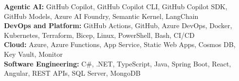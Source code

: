 \textbf{Agentic AI:} GitHub Copilot, GitHub Copilot CLI, GitHub Copilot SDK, GitHub Models, Azure AI Foundry, Semantic Kernel, LangChain\\
\textbf{DevOps and Platform:} GitHub Actions, GitHub, Azure DevOps, Docker, Kubernetes, Terraform, Bicep, Linux, PowerShell, Bash, CI/CD\\
\textbf{Cloud:} Azure, Azure Functions, App Service, Static Web Apps, Cosmos DB, Key Vault, Monitor\\
\textbf{Software Engineering:} C\#, .NET, TypeScript, Java, Spring Boot, React, Angular, REST APIs, SQL Server, MongoDB
